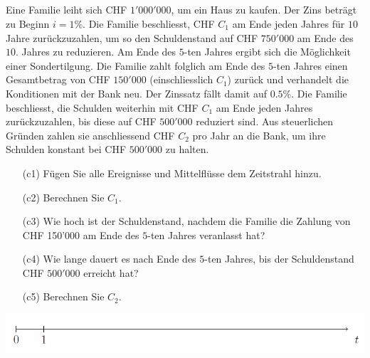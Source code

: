 \subsection*{}
Eine Familie leiht sich CHF $ 1'000'000 $, um ein Haus zu kaufen.
Der Zins beträgt zu Beginn $ i = 1 \% $.
Die Familie beschliesst, CHF $ C_1 $ am Ende jeden Jahres für $ 10 $ Jahre zurückzuzahlen, um so den Schuldenstand auf CHF $ 750'000 $ am Ende des $ 10. $ Jahres zu reduzieren.
Am Ende des $ 5 $-ten Jahres ergibt sich die Möglichkeit einer Sondertilgung.
Die Familie zahlt folglich am Ende des $ 5 $-ten Jahres einen Gesamtbetrag von CHF $ 150'000 $ (einschliesslich $ C_1 $) zurück und verhandelt die Konditionen mit der Bank neu.
Der Zinssatz fällt damit auf $ 0.5 \% $.
Die Familie beschliesst, die Schulden weiterhin mit CHF $ C_1 $ am Ende jeden Jahres zurückzuzahlen, bis diese auf CHF $ 500'000 $ reduziert sind.
Aus steuerlichen Gründen zahlen sie anschliessend CHF $ C_2 $ pro Jahr an die Bank,
um ihre Schulden konstant bei CHF $ 500'000 $ zu halten.
\begin{enumerate}
	\item[(c1)]
	Fügen Sie alle Ereignisse und Mittelflüsse dem Zeitstrahl hinzu.
	\item[(c2)] 
	Berechnen Sie $ C_1 $.
	\item[(c3)] Wie hoch ist der Schuldenstand, nachdem die Familie die Zahlung von CHF 150'000 am Ende des $ 5 $-ten Jahres veranlasst hat?
	\item[(c4)] 
	Wie lange dauert es nach Ende des $ 5 $-ten Jahres, bis der Schuldenstand CHF $ 500'000 $ erreicht hat?
	\item[(c5)]
	Berechnen Sie $ C_2 $.
\end{enumerate}
\begin{center}
	\includegraphics[scale=0.6]{pictures/zeitstrahl_1_c}
\end{center}

\newpage

